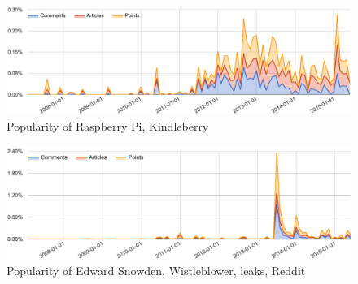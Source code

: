 \begin{figure}[H] %
	\caption{Popularity of Raspberry Pi, Kindleberry}
	\label{fig:trend_raspberry}
	\centering
	\includegraphics[width=14cm]{topic_trends/raspberry_relative}
\end{figure}

\begin{figure}[H] %
	\caption{Popularity of Edward Snowden, Wistleblower, leaks, Reddit}
	\label{fig:trend_snowden}
	\centering
	\includegraphics[width=14cm]{topic_trends/snowden_relative}
\end{figure}
\lipsum[1]
